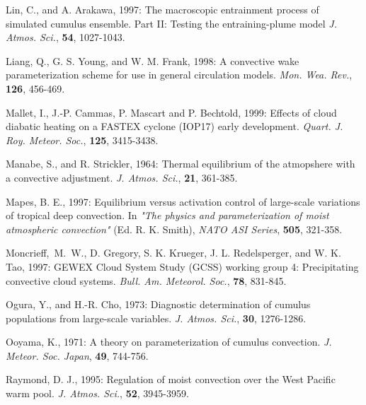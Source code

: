 

\por
Lin, C., and A. Arakawa, 1997: The macroscopic entrainment process of simulated
cumulus ensemble. Part II: Testing the entraining-plume model
{\it J. Atmos. Sci.}, {\bf 54}, 1027-1043.

\por
Liang, Q., G. S. Young, and W. M. Frank, 1998:  A convective wake parameterization
scheme for use in general circulation models. {\it Mon. Wea. Rev.}, {\bf 126},
456-469.

\por
Mallet, I., J.-P. Cammas, P. Mascart and P. Bechtold, 1999:
Effects of cloud diabatic heating on a FASTEX cyclone (IOP17) early
development. {\it Quart. J. Roy. Meteor. Soc.}, {\bf 125}, 3415-3438.

\por Manabe, S., and R. Strickler, 1964: Thermal equilibrium
of the atmopshere with a convective adjustment.
{\it J. Atmos. Sci.}, {\bf 21}, 361-385.

\por
Mapes, B. E., 1997:
 Equilibrium versus activation control of large-scale
variations of tropical deep convection.
In {\it "The physics and parameterization of moist atmospheric convection"}
(Ed. R. K. Smith), {\it NATO ASI Series}, {\bf 505}, 321-358.

\por
Moncrieff,~M.~W., D. Gregory, S. K. Krueger, J. L. Redelsperger, and
 W. K. Tao, 1997:
 GEWEX Cloud System Study (GCSS) working group 4:
 Precipitating convective cloud systems. {\it Bull. Am. Meteorol. Soc.},
 {\bf 78}, 831-845.

\por
Ogura, Y., and H.-R. Cho, 1973: Diagnostic determination of cumulus
populations from large-scale variables. {\it J. Atmos. Sci.},
{\bf 30}, 1276-1286.

\por
Ooyama, K., 1971: A theory on parameterization of cumulus convection.
{\it J. Meteor. Soc. Japan}, {\bf 49}, 744-756.

\por
Raymond, D. J., 1995: Regulation of moist convection over the
West Pacific warm pool. {\it J. Atmos. Sci.}, {\bf 52}, 3945-3959.

